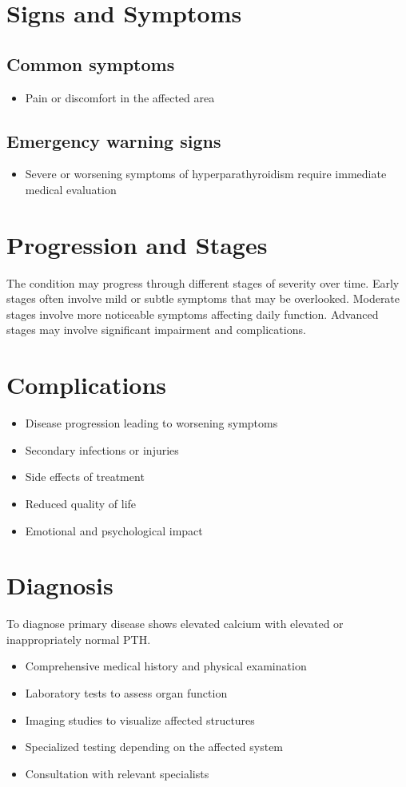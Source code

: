 \section{Signs and Symptoms}
\subsection{Common symptoms}
\begin{itemize}[noitemsep]
  \item Pain or discomfort in the affected area
  \end{itemize}
\subsection{Emergency warning signs}
\begin{itemize}[noitemsep]
  \item Severe or worsening symptoms of hyperparathyroidism require immediate medical evaluation
\end{itemize}
\section{Progression and Stages}
The condition may progress through different stages of severity over time. Early stages often involve mild or subtle symptoms that may be overlooked. Moderate stages involve more noticeable symptoms affecting daily function. Advanced stages may involve significant impairment and complications.
\section{Complications}
\begin{itemize}[noitemsep]
  \item Disease progression leading to worsening symptoms
  \item Secondary infections or injuries
  \item Side effects of treatment
  \item Reduced quality of life
  \item Emotional and psychological impact
\end{itemize}
\section{Diagnosis}
To diagnose primary disease shows elevated calcium with elevated or inappropriately normal PTH.

\begin{itemize}[noitemsep]
  \item Comprehensive medical history and physical examination
  \item Laboratory tests to assess organ function
  \item Imaging studies to visualize affected structures
  \item Specialized testing depending on the affected system
  \item Consultation with relevant specialists
\end{itemize}
